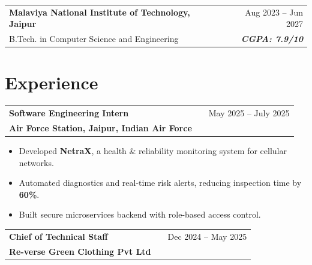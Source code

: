 \documentclass[a4paper,10pt]{article}
\begin{document}
\vspace{-2pt}

\begin{tabularx}{\linewidth}{ @{}l X r@{} }

\color[HTML]{1C033C} \textbf{Malaviya National Institute of Technology, Jaipur} & \hfill & \color[HTML]{371e77} Aug 2023 -- Jun 2027 \\

\color[HTML]{371e77} B.Tech. in Computer Science and Engineering & \hfill & \color[HTML]{4B28A4} \textit{\textbf{CGPA: 7.9/10}} \\

\end{tabularx}




\section{Experience}



\begin{tabularx}{\linewidth}{ @{}l X r@{} }

\textbf{Software Engineering Intern} & \hfill & \textcolor[HTML]{371e77}{May 2025 -- July 2025} \\

\textcolor[HTML]{371e77}{\textbf{Air Force Station, Jaipur, Indian Air Force}} & & \\

\end{tabularx}

\vspace{-8pt}

\begin{itemize}[nosep, leftmargin=1.5em]

\item Developed \textbf{NetraX}, a health \& reliability monitoring system for cellular networks.

\item Automated diagnostics and real-time risk alerts, reducing inspection time by \textbf{60\%}.

\item Built secure microservices backend with role-based access control.

\end{itemize}



\begin{tabularx}{\linewidth}{ @{}l X r@{} }

\textbf{Chief of Technical Staff} & \hfill & \textcolor[HTML]{371e77}{Dec 2024 -- May 2025} \\

\textcolor[HTML]{371e77}{\textbf{Re-verse Green Clothing Pvt Ltd}} & & \\

\end{tabularx}
\end{document}
